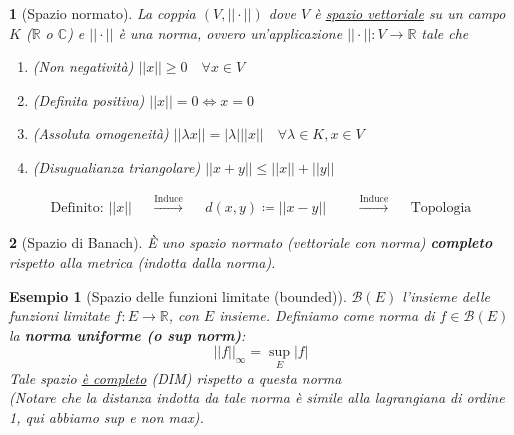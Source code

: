 \documentclass[a4paper,10pt]{article}
\newcommand{\re}{\mathbb{R}} %
\newcommand{\im}{\mathbb{C}} %
\theoremstyle{indentdefinition}
\theoremstyle{indenttheorem}
\theoremstyle{myremark}
\newtheorem{es}{Esempio}
\theoremstyle{indentgeneral}
\newtheorem*{gen}{}
\begin{document}
\begin{gen}[Spazio normato]
    La coppia $(V, ||\cdot||)$ dove $V$ è \underline{spazio vettoriale} su un campo $K$ ($\re$ o $\im$)  e $||\cdot||$ è una norma, ovvero un'applicazione $||\cdot||: V \to \re$ tale che
    \begin{enumerate}
        \item (Non negatività) $||x||\ge 0 \quad \forall x\in V$
        \item (Definita positiva) $||x||=0 \iff x=0$
        \item (Assoluta omogeneità) $||\lambda x||=|\lambda| ||x|| \quad \forall \lambda \in K, x\in V$
        \item (Disugualianza triangolare) $||x+y||\le ||x||+||y||$
    \end{enumerate}
    \begin{align*}
        \text{Definito: } ||x|| & & \overset{\text{Induce}}{\longrightarrow} & & d(x,y) \coloneqq ||x-y||  & & 
        &\overset{\text{Induce}}{\longrightarrow} & & \text{Topologia} 
\end{align*}
\end{gen}



\begin{gen}[Spazio di Banach]
    È uno spazio normato (vettoriale con norma) \textbf{completo} rispetto alla metrica (indotta dalla norma).
\end{gen}

\begin{es}[Spazio delle funzioni limitate (bounded)] $\mathcal{B}(E)$ l'insieme delle funzioni limitate $f: E\to\re$, con $E$ insieme. Definiamo come norma di $f\in\mathcal{B}(E)$ la \textbf{norma uniforme (o sup norm)}:
$$||f||_{\infty}=\sup_E|f|$$
Tale spazio \underline{è completo} (DIM) rispetto a questa norma \\
(Notare che la distanza indotta da tale norma è simile alla lagrangiana di ordine 1, qui abbiamo sup e non max). 

\end{es}
\end{document}
